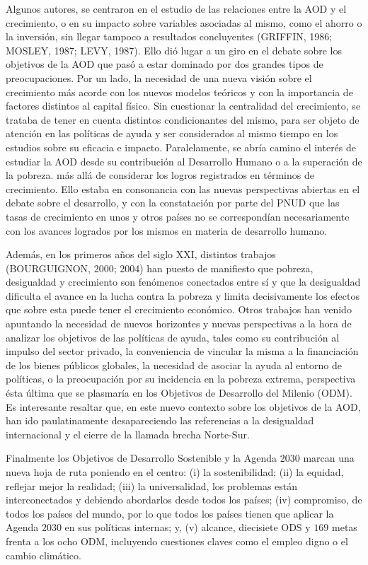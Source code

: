 \documentclass[10pt,a4paper]{article}
\begin{document}
Algunos autores, se centraron en el estudio de las relaciones entre la AOD y el crecimiento, o en su impacto sobre variables asociadas al mismo, como el ahorro o la inversión, sin llegar tampoco a resultados concluyentes (GRIFFIN, 1986; MOSLEY, 1987; LEVY, 1987). Ello dió lugar a un giro en el debate sobre los objetivos de la AOD que pasó a estar dominado por dos grandes tipos de preocupaciones. Por un lado, la necesidad de una nueva visión sobre el crecimiento más acorde con los nuevos modelos teóricos y con la importancia de factores distintos al capital físico. Sin cuestionar la centralidad del crecimiento, se trataba de tener en cuenta distintos condicionantes del mismo, para ser objeto de atención en las políticas de ayuda y ser considerados al mismo tiempo en los estudios sobre su eficacia e impacto. Paralelamente, se abría camino el interés de estudiar la AOD desde su contribución al Desarrollo Humano o a la superación de la pobreza. más allá de considerar los logros registrados en términos de crecimiento. Ello estaba en consonancia con las nuevas perspectivas abiertas en el debate sobre el desarrollo, y con la constatación por parte del PNUD que las tasas de crecimiento en unos y otros países no se correspondían necesariamente con los avances logrados por los mismos en materia de desarrollo humano. 

Además, en los primeros años del siglo XXI, distintos trabajos (BOURGUIGNON, 2000; 2004) han puesto de manifiesto que pobreza, desigualdad y crecimiento son fenómenos conectados entre sí y que la desigualdad dificulta el avance en la lucha contra la pobreza y limita decisivamente los efectos que sobre esta puede tener el crecimiento económico. Otros trabajos han venido apuntando la necesidad de nuevos horizontes y nuevas perspectivas a la hora de analizar los objetivos de las políticas de ayuda, tales como su contribución al impulso del sector privado, la conveniencia de vincular la misma a la financiación de los bienes públicos globales, la necesidad de asociar la ayuda al entorno de políticas, o la preocupación por su incidencia en la pobreza extrema, perspectiva ésta última que se plasmaría en los Objetivos de Desarrollo del Milenio (ODM). Es interesante resaltar que, en este nuevo contexto sobre los objetivos de la AOD, han ido paulatinamente desapareciendo las referencias a la desigualdad internacional y el cierre de la llamada brecha Norte-Sur.

Finalmente los Objetivos de Desarrollo Sostenible y la Agenda 2030 marcan una nueva hoja de ruta poniendo en el centro: (i) la sostenibilidad; (ii) la equidad, reflejar mejor la realidad; (iii) la universalidad, los problemas están interconectados y debiendo abordarlos desde todos los países; (iv) compromiso, de todos los países del mundo, por lo que todos los países tienen que aplicar la Agenda 2030 en sus políticas internas; y, (v) alcance, diecisiete ODS y $169$ metas frenta a los ocho ODM, incluyendo cuestiones claves como el empleo digno o el cambio climático. 
\end{document}
